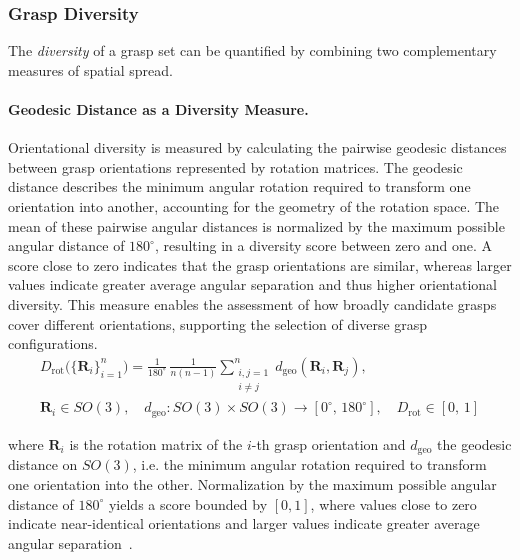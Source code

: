 \subsubsection{Grasp Diversity}
\label{subsubsec:grasp_diversity}

The \emph{diversity} of a grasp set can be quantified by combining two complementary measures of spatial spread.

\paragraph{Geodesic Distance as a Diversity Measure.}
Orientational diversity is measured by calculating the pairwise geodesic distances between grasp orientations represented by rotation matrices. The
geodesic distance describes the minimum angular rotation required to transform one orientation into another, accounting for the geometry of the
rotation space. The mean of these pairwise angular distances is normalized by the maximum possible angular distance of $180^\circ$, resulting in a
diversity score between zero and one. A score close to zero indicates that the grasp orientations are similar, whereas larger values indicate greater
average angular separation and thus higher orientational diversity. This measure enables the assessment of how broadly candidate grasps cover
different orientations, supporting the selection of diverse grasp configurations.
\begin{equation}
    \begin{gathered}
        D_{\mathrm{rot}}\bigl(\{\mathbf{R}_i\}_{i=1}^{n}\bigr)
        =
        \frac{1}{180^\circ}\,
        \frac{1}{n(n-1)}
        \sum_{\substack{i,j=1 \\ i \neq j}}^{n}
        d_{\mathrm{geo}}(\mathbf{R}_i, \mathbf{R}_j), \\[4pt]
        \mathbf{R}_i \in SO(3),\quad
        d_{\mathrm{geo}} : SO(3) \times SO(3) \rightarrow [0^\circ,\, 180^\circ],\quad
        D_{\mathrm{rot}} \in [0,\,1]
    \end{gathered}
\end{equation}

where $\mathbf{R}_i$ is the rotation matrix of the $i$-th grasp orientation and
$d_{\mathrm{geo}}$ the geodesic distance on $SO(3)$, i.e. the minimum angular rotation
required to transform one orientation into the other. Normalization by the maximum
possible angular distance of $180^\circ$ yields a score bounded by $[0,1]$, where values close
to zero indicate near-identical orientations and larger values indicate greater average
angular separation~\cite{Huynh2009, anowar2021conceptual}.

